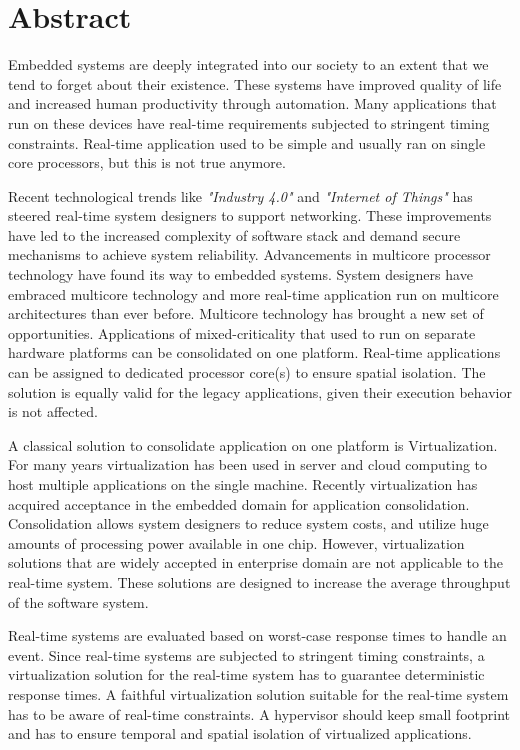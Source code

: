 \chapter*{Abstract}
Embedded systems are deeply integrated into our society to an extent that we tend to forget about their existence.
These systems have improved quality of life and increased human productivity through automation.
Many applications that run on these devices have real-time requirements subjected to stringent timing constraints.
Real-time application used to be simple and usually ran on single core processors, but this is not true anymore. 

Recent technological trends like \emph{"Industry 4.0"} and \emph{"Internet of Things"}
has steered real-time system designers to support networking.
These improvements have led to the increased complexity of software stack and demand secure 
mechanisms to achieve system reliability.
Advancements in multicore processor technology have found its way to embedded systems. 
System designers have embraced multicore technology and more real-time application run on multicore architectures than ever before.
Multicore technology has brought a new set of opportunities.
Applications of mixed-criticality that used to run on separate hardware platforms can be consolidated on one platform.
Real-time applications can be assigned to dedicated processor core(s) to ensure spatial isolation. 
The solution is equally valid for the legacy applications, given their execution behavior
is not affected.

A classical solution to consolidate application on one platform is Virtualization.
For many years virtualization has been used in server and cloud computing to host multiple applications
on the single machine.
Recently virtualization has acquired acceptance in the embedded domain for application consolidation.
Consolidation allows system designers to reduce system costs, and utilize huge amounts of processing power available in one chip.
However, virtualization solutions that are widely accepted in enterprise domain are not applicable to the
real-time system. 
These solutions are designed to increase the average throughput of the software system.

Real-time systems are evaluated based on worst-case response times to handle an event.
Since real-time systems are subjected to stringent timing constraints, a virtualization
solution for the real-time system has to guarantee deterministic response times.
A faithful virtualization solution suitable for the real-time system has to
be aware of real-time constraints. A hypervisor should keep small footprint and 
has to ensure temporal and spatial isolation of virtualized applications.

